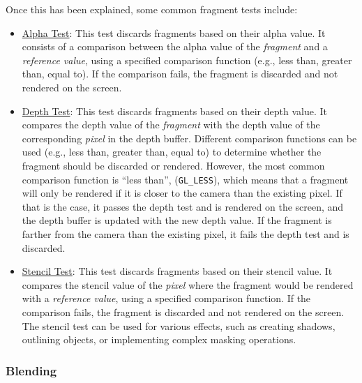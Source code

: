 Once this has been explained, some common fragment tests include:
\begin{itemize}
    \item \ul{Alpha Test}: This test discards fragments based on their alpha value. It consists of a comparison between the alpha value of the \emph{fragment} and a \emph{reference value}, using a specified comparison function (e.g., less than, greater than, equal to). If the comparison fails, the fragment is discarded and not rendered on the screen.
    \item \ul{Depth Test}: This test discards fragments based on their depth value. It compares the depth value of the \emph{fragment} with the depth value of the corresponding \emph{pixel} in the depth buffer. Different comparison functions can be used (e.g., less than, greater than, equal to) to determine whether the fragment should be discarded or rendered. However, the most common comparison function is ``less than'', (\texttt{GL\_LESS}), which means that a fragment will only be rendered if it is closer to the camera than the existing pixel. If that is the case, it passes the depth test and is rendered on the screen, and the depth buffer is updated with the new depth value. If the fragment is farther from the camera than the existing pixel, it fails the depth test and is discarded.
    \item \ul{Stencil Test}: This test discards fragments based on their stencil value. It compares the stencil value of the \emph{pixel} where the fragment would be rendered with a \emph{reference value}, using a specified comparison function. If the comparison fails, the fragment is discarded and not rendered on the screen. The stencil test can be used for various effects, such as creating shadows, outlining objects, or implementing complex masking operations.
\end{itemize}
\subsubsection{Blending}\label{sec:blending}

